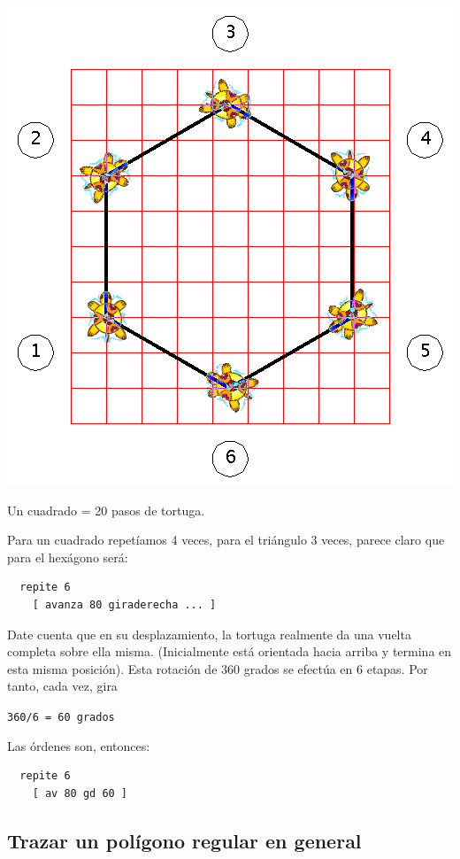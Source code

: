 \documentclass[12pt,twoside,spanish,a4paper]{report}
\begin{document}
% 
\begin{center}
   \includegraphics[scale=0.3]{Imagenes_Tutorial/03_Hexagono}

   Un cuadrado = 20 pasos de tortuga.
\end{center}

Para un cuadrado repet\'iamos 4 veces, para el tri\'angulo 3 veces, parece
claro que para el hex\'agono ser\'a:
\begin{verbatim}
  repite 6
    [ avanza 80 giraderecha ... ] 
\end{verbatim}
Date cuenta que en su desplazamiento, la tortuga realmente da una
vuelta completa sobre ella misma. (Inicialmente est\'a orientada hacia
arriba y termina en esta misma posici\'on). Esta rotaci\'on de 360 grados
se efect\'ua en 6 etapas. Por tanto, cada vez, gira
\begin{center}
   \texttt{360/6 = 60 grados}
\end{center}
Las \'ordenes son, entonces:
\begin{verbatim}
  repite 6
    [ av 80 gd 60 ] \end{verbatim}

\subsection{Trazar un pol\'igono regular en general}
   \label{sub:Trazar-poligono}
\end{document}
